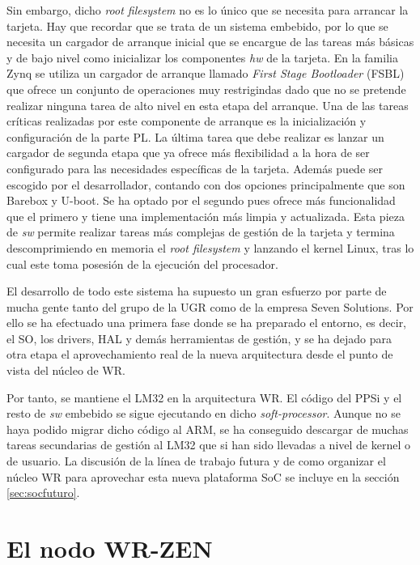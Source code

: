 Sin embargo, dicho \textit{root filesystem} no es lo único que se necesita para 
arrancar la tarjeta. Hay que recordar que se trata de un sistema embebido, por 
lo que se necesita un cargador de arranque inicial que se encargue de las 
tareas más básicas y de bajo nivel como inicializar los componentes \textit{hw} 
de la tarjeta. En la familia Zynq se utiliza un cargador de arranque llamado 
\textit{First Stage Bootloader} (FSBL) que ofrece un conjunto de operaciones 
muy restrigindas dado que no se pretende realizar ninguna tarea de alto nivel 
en esta etapa del arranque. Una de las tareas críticas realizadas por este 
componente de arranque es la inicialización y configuración de la parte PL. La 
última tarea que debe realizar es lanzar un cargador de segunda etapa que ya 
ofrece más flexibilidad a la hora de ser configurado para las necesidades 
específicas de la tarjeta. Además puede ser escogido por el desarrollador, 
contando con dos opciones principalmente que son Barebox y U-boot. Se ha optado 
por el segundo pues ofrece más funcionalidad que el primero y tiene una 
implementación más limpia y actualizada. Esta pieza de \textit{sw} permite 
realizar tareas más complejas de gestión de la tarjeta y termina 
descomprimiendo en memoria el \textit{root filesystem} y lanzando el kernel 
Linux, tras lo cual este toma posesión de la ejecución del procesador.

El desarrollo de todo este sistema ha supuesto un gran esfuerzo por parte de 
mucha gente tanto del grupo de la UGR como de la empresa Seven Solutions. Por 
ello se ha efectuado una primera fase donde se ha preparado el entorno, es 
decir, el SO, los drivers, HAL y demás herramientas de gestión, y se ha dejado 
para otra etapa el aprovechamiento real de la nueva arquitectura desde el punto 
de vista del núcleo de WR.

Por tanto, se mantiene el LM32 en la arquitectura WR. El código del PPSi y el 
resto de \textit{sw} embebido se sigue ejecutando en dicho 
\textit{soft-processor}. Aunque no se haya podido migrar dicho código al ARM, 
se ha conseguido descargar de muchas tareas secundarias de gestión al LM32 que 
si han sido llevadas a nivel de kernel o de usuario. La discusión de la línea 
de trabajo futura y de como organizar el núcleo WR para aprovechar esta nueva 
plataforma SoC se incluye en la sección \ref{sec:socfuturo}.

\section{El nodo WR-ZEN}

